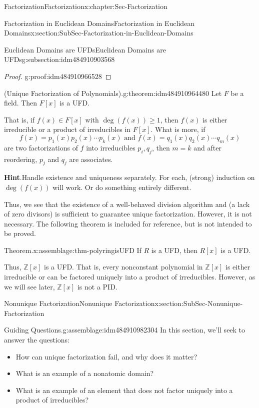 \documentclass[oneside,10pt,]{book}
\newcommand{\blocktitlefont}{\relax}
\numberwithin{equation}{section}
\renewcommand{\ge}{\geqslant}
\def\Z{{\mathbb Z}}
\begin{document}
\begin{chapterptx}{Factorization}{}{Factorization}{}{}{x:chapter:Sec-Factorization}
\begin{sectionptx}{Factorization in Euclidean Domains}{}{Factorization in Euclidean Domains}{}{}{x:section:SubSec-Factorization-in-Euclidean-Domains}
\begin{subsectionptx}{Euclidean Domains are UFDs}{}{Euclidean Domains are UFDs}{}{}{g:subsection:idm484910903568}
\begin{proof}{}{g:proof:idm484910966528}
\end{proof}
\begin{theorem}{(Unique Factorization of Polynomials).}{}{g:theorem:idm484910964480}%
Let \(F\) be a field. Then \(F[x]\) is a UFD.%
\par
That is, if \(f(x) \in F[x]\) with \(\deg(f(x)) \ge 1\), then \(f(x)\) is either irreducible or a product of irreducibles in \(F[x]\). What is more, if%
\begin{equation*}
f(x) = p_1(x) p_2(x) \cdots p_k(x) \text{ and }  f(x) = q_1(x) q_2(x) \cdots q_m(x)
\end{equation*}
are two factorizations of \(f\) into irreducibles \(p_i, q_j\), then \(m=k\) and after reordering, \(p_j\) and \(q_j\) are associates.%

\textbf{\blocktitlefont Hint}.\quad{}Handle existence and uniqueness separately. For each, (strong) induction on \(\deg(f(x))\) will work. Or do something entirely different.%
\end{theorem}
Thus, we see that the existence of a well-behaved division algorithm and (a lack of zero divisors) is sufficient to guarantee unique factorization. However, it is not necessary. The following theorem is included for reference, but is not intended to be proved.%
\begin{assemblage}{Theorem.}{x:assemblage:thm-polyringisUFD}%
If \(R\) is a UFD, then \(R[x]\) is a UFD.%
\end{assemblage}
Thus, \(\Z[x]\) is a UFD. That is, every nonconstant polynomial in \(\Z[x]\) is either irreducible or can be factored uniquely into a product of irreducibles.  However, as we will see later, \(\Z[x]\) is not a PID.%
\end{subsectionptx}
\end{sectionptx}
%
%
\typeout{************************************************}
\typeout{************************************************}
%
\begin{sectionptx}{Nonunique Factorization}{}{Nonunique Factorization}{}{}{x:section:SubSec-Nonunique-Factorization}
\begin{assemblage}{Guiding Questions.}{g:assemblage:idm484910982304}%
In this section, we'll seek to answer the questions: %
\begin{itemize}[label=\textbullet]
\item{}How can unique factorization fail, and why does it matter?%
\item{}What is an example of a nonatomic domain?%
\item{}What is an example of an element that does not factor uniquely into a product of irreducibles?%

\end{itemize}
\end{assemblage}
\end{sectionptx}
\end{chapterptx}
\end{document}

